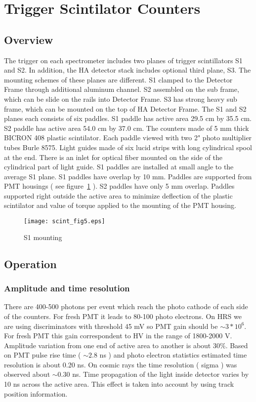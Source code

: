\documentclass[12pt]{article}
\begin{document}
\section{Trigger Scintilator Counters}
\subsection{Overview}

The trigger on each spectrometer includes two planes of trigger scintillators S1 and S2.
In addition, the HA detector stack includes optional third plane, S3. The mounting schemes
of these planes are different. S1 clamped to the Detector Frame through additional 
aluminum channel. S2 assembled on the sub frame, which can be slide on the rails into Detector Frame.
S3 has strong heavy sub frame, which can be mounted on the top of HA Detector Frame.  
The S1 and S2 planes each consists of six paddles. S1 paddle has active area 29.5 cm by 35.5 cm.
S2 paddle has active area 54.0 cm by 37.0 cm. The counters made of 5 mm thick BICRON 
408 plastic scintilator. Each paddle viewed with two 2" photo multiplier tubes Burle 8575. 
Light guides made of six lucid strips with long cylindrical spool at the end. There is 
an inlet for optical fiber mounted on the side of the cylindrical part of light guide.
S1 paddles are installed at small angle to the average S1 plane. S1 paddles have overlap by 10 mm. 
Paddles are supported from PMT housings ( see figure~\ref{S1_mounting} ). 
S2 paddles have only 5 mm overlap. Paddles supported right 
outside the active area to minimize deflection of the plastic scintilator and value of 
torque applied to the mounting of the PMT housing.

\begin{figure}
\begin{center}
\texttt{[image: scint\_fig5.eps]}
{\linespread{1.}
\caption[S1 mounting scheme]{S1 mounting}
\label{S1_mounting}}
\end{center}
\end{figure}

\subsection{Operation}
\subsubsection{Amplitude and time resolution}

There are 400-500 photons per event which reach the photo cathode of each side of the counters.
For fresh PMT it leads to 80-100 photo electrons. On HRS we are using discriminators with 
threshold 45 mV so PMT gain should be $\sim 3*10^6$. For fresh PMT this gain correspondent to 
HV in the range of 1800-2000 V. 
Amplitude variation from one end of active area to another is about 30\%. 
Based on PMT pulse rise time ( $ \sim 2.8 $ ns ) and photo electron statistics estimated time resolution 
is about 0.20 ns. On cosmic rays the time resolution ( sigma ) was observed about $\sim 0.30$ ns.  
Time propagation of the light inside detector varies by 10 ns across the active area. This effect 
is taken into account by using track position information.
\end{document}
